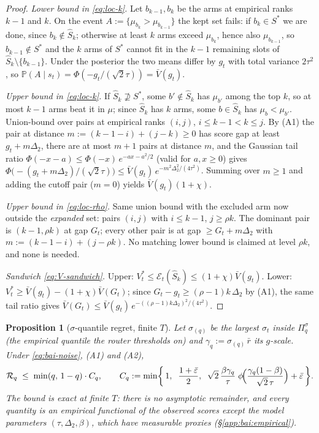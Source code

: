 \documentclass[11pt]{article}
\newtheorem{proposition}{Proposition}
\theoremstyle{remark}
\begin{document}
\begin{proof}
\emph{Lower bound in \eqref{eq:loc-k}.} Let $b_{k-1}, b_k$ be the arms at empirical ranks $k{-}1$ and $k$. On the event $A := \{\mu_{b_k} > \mu_{b_{k-1}}\}$ the kept set fails: if $b_k \in S^*$ we are done, since $b_k \notin \widehat S_k$; otherwise at least $k$ arms exceed $\mu_{b_k}$, hence also $\mu_{b_{k-1}}$, so $b_{k-1} \notin S^*$ and the $k$ arms of $S^*$ cannot fit in the $k-1$ remaining slots of $\widehat S_k \setminus \{b_{k-1}\}$. Under the posterior the two means differ by $g_t$ with total variance $2\tau^2$, so $\mathbb P(A \mid s_t) = \Phi(-g_t/(\sqrt2\tau)) = \bar V(g_t)$.

\emph{Upper bound in \eqref{eq:loc-k}.} If $\widehat S_k \not\supseteq S^*$, some $b' \notin \widehat S_k$ has $\mu_{b'}$ among the top $k$, so at most $k-1$ arms beat it in $\mu$; since $\widehat S_k$ has $k$ arms, some $b \in \widehat S_k$ has $\mu_b < \mu_{b'}$. Union-bound over pairs at empirical ranks $(i, j)$, $i \le k-1 < k \le j$. By (A1) the pair at distance $m := (k-1-i) + (j-k) \ge 0$ has score gap at least $g_t + m\Delta_2$, there are at most $m+1$ pairs at distance $m$, and the Gaussian tail ratio $\Phi(-x-a) \le \Phi(-x)\,e^{-ax - a^2/2}$ (valid for $a, x \ge 0$) gives $\Phi\bigl(-(g_t + m\Delta_2)/(\sqrt2\tau)\bigr) \le \bar V(g_t)\, e^{-m^2\Delta_2^2/(4\tau^2)}$. Summing over $m \ge 1$ and adding the cutoff pair ($m = 0$) yields $\bar V(g_t)(1+\chi)$.

\emph{Upper bound in \eqref{eq:loc-rho}.} Same union bound with the excluded arm now outside the \emph{expanded} set: pairs $(i, j)$ with $i \le k-1$, $j \ge \rho k$. The dominant pair is $(k{-}1, \rho k)$ at gap $G_t$; every other pair is at gap $\ge G_t + m\Delta_2$ with $m := (k-1-i) + (j - \rho k)$. No matching lower bound is claimed at level $\rho k$, and none is needed.

\emph{Sandwich \eqref{eq:V-sandwich}.} Upper: $V^*_t \le \mathcal E_t(\widehat S_k) \le (1+\chi)\bar V(g_t)$. Lower: $V^*_t \ge \bar V(g_t) - (1+\chi)\bar V(G_t)$; since $G_t - g_t \ge (\rho-1)k\,\Delta_2$ by (A1), the same tail ratio gives $\bar V(G_t) \le \bar V(g_t)\, e^{-((\rho-1)k\Delta_2)^2/(4\tau^2)}$.
\end{proof}

\begin{proposition}[$\sigma$-quantile regret, finite $T$]\label{prop:bai-bound}
Let $\sigma_{(q)}$ be the largest $\sigma_t$ inside $\Pi_q^\sigma$ (the empirical quantile the router thresholds on) and $\gamma_q := \sigma_{(q)}\,\bar r$ its $g$-scale. Under \eqref{eq:bai-noise}, (A1) and (A2),
\begin{equation}\label{eq:bai-suboptimality}
\mathcal R_q \;\le\; \min(q,\, 1-q)\cdot C_q,
\qquad
C_q := \min\biggl\{\, 1,\;\; \frac{1+\bar\varepsilon}{2},\;\; \sqrt2\,\frac{\beta \gamma_q}{\tau}\; \phi\!\Bigl(\frac{\gamma_q(1-\beta)}{\sqrt2\,\tau}\Bigr) + \bar\varepsilon \,\biggr\}.
\end{equation}
The bound is exact at finite $T$: there is no asymptotic remainder, and every quantity is an empirical functional of the observed scores except the model parameters $(\tau, \Delta_2, \beta)$, which have measurable proxies (\S\ref{app:bai:empirical}).
\end{proposition}
\end{document}
